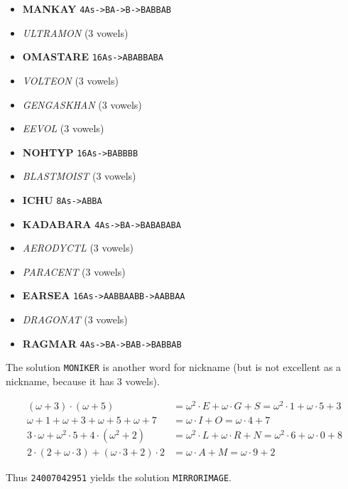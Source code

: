 \begin{multicols}{2}
  \begin{itemize}
    \item \textbf{MANKAY} \texttt{4As->BA->B->BABBAB}
    \item \textit{ULTRAMON} (3 vowels)
    \item \textbf{OMASTARE} \texttt{16As->ABABBABA}
    \item \textit{VOLTEON} (3 vowels)
    \item \textit{GENGASKHAN} (3 vowels)
    \item \textit{EEVOL} (3 vowels)
    \item \textbf{NOHTYP} \texttt{16As->BABBBB}
    \item \textit{BLASTMOIST} (3 vowels)
    \item \textbf{ICHU} \texttt{8As->ABBA}
    \item \textbf{KADABARA} \texttt{4As->BA->BABABABA}
    \item \textit{AERODYCTL} (3 vowels)
    \item \textit{PARACENT} (3 vowels)
    \item \textbf{EARSEA} \texttt{16As->AABBAABB->AABBAA}
    \item \textit{DRAGONAT} (3 vowels)
    \item \textbf{RAGMAR} \texttt{4As->BA->BAB->BABBAB}
  \end{itemize}
\end{multicols}

The solution \texttt{MONIKER} is another word for nickname
(but is not excellent as a nickname, because it has 3 vowels).


\begin{align*}
  (\omega+3)\cdot(\omega+5)&=\omega^2\cdot E+\omega\cdot G+S
                            =\omega^2\cdot 1+\omega\cdot 5+3 \\
  \omega+1+\omega+3+\omega+5+\omega+7&=\omega\cdot I+O
                                      =\omega\cdot 4+7 \\
  3\cdot\omega+\omega^2\cdot 5+4\cdot(\omega^2+2)&=
        \omega^2\cdot L+\omega\cdot R+N =
        \omega^2\cdot 6+\omega\cdot 0+8 \\
  2\cdot(2+\omega\cdot3)+(\omega\cdot3+2)\cdot2&=
        \omega\cdot A+M =
        \omega\cdot 9+2
\end{align*}

Thus \texttt{24007042951} yields the solution \texttt{MIRRORIMAGE}.

